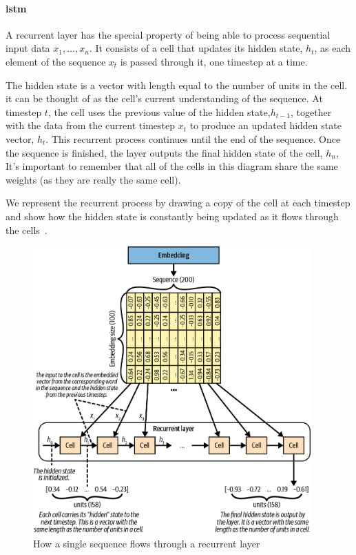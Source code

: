 \paragraph{\gls{lstm}}


A recurrent layer has the special property of being able to process sequential input data \(x_{1}, \ldots , x_{n} \).
It consists of a cell that updates its hidden state, \( h_{t}\), as each element of the sequence \( x_{t} \) is passed through it, one timestep at a time.

The hidden state is a vector with length equal to the number of units in the cell.
it can be thought of as the cell’s current understanding of the sequence.
At timestep \( t \), the cell uses the previous value of the hidden state,\( h_{t-1} \), together with the data from the current timestep \( x_{t} \) to produce an updated hidden state vector, \( h_t\).
This recurrent process continues until the end of the sequence.
Once the sequence is finished, the layer outputs the final hidden state of the cell, \( h_n \),
It’s important to remember that all of the cells in this diagram share the same weights (as they are really the same cell).

We represent the recurrent process by drawing a copy of the cell at each timestep and show how the hidden state is constantly being updated as it flows through the cells~.

\begin{figure}
	\begin{center}
		\includegraphics[width=0.95\textwidth]{figures/recurrent_layer}
	\end{center}
	\caption{How a single sequence flows through a recurrent layer}\label{fig:recurrent_layer}
\end{figure}


